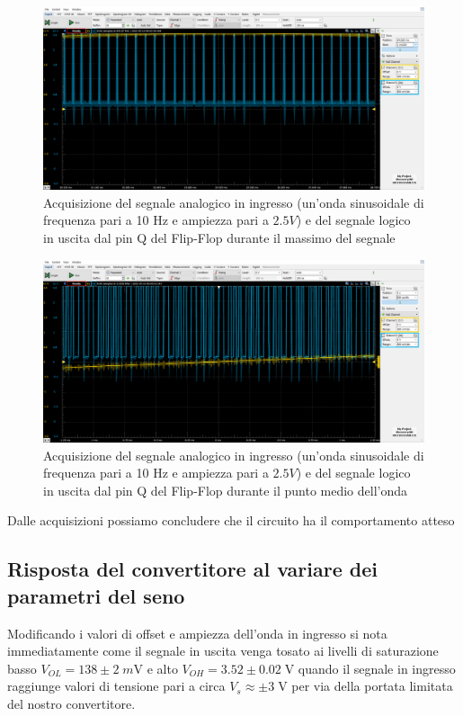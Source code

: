 \documentclass[10pt, a4paper, italian]{article}
\begin{document}
\begin{figure}[htbp]
    \centering
	\includegraphics[width=\textwidth]{TOP}
    \caption{Acquisizione del segnale analogico in ingresso (un'onda sinusoidale di frequenza pari a 10 Hz e ampiezza pari a $2.5 V$) e del segnale logico in uscita dal pin Q del Flip-Flop durante il massimo del segnale}
\end{figure}
\begin{figure}[htbp]
    \centering
	\includegraphics[width=\textwidth]{MIDDLE}
    \caption{Acquisizione del segnale analogico in ingresso (un'onda sinusoidale di frequenza pari a 10 Hz e ampiezza pari a $2.5 V$) e del segnale logico in uscita dal pin Q del Flip-Flop durante il punto medio dell'onda}
\end{figure}
Dalle acquisizioni possiamo concludere che il circuito ha il comportamento atteso
\subsection{Risposta del convertitore al variare dei parametri del seno}
\label{sbs: adcresp}
Modificando i valori di offset e ampiezza dell'onda in ingresso si nota
immediatamente come il segnale in uscita venga tosato ai livelli di
saturazione basso $V_{OL} = 138 \pm 2 \; \si{m\V}$ e alto
$V_{OH} = 3.52 \pm 0.02 \; \si{\V}$ quando il segnale in ingresso raggiunge
valori di tensione pari a circa $V_s \approx \pm 3 \; \si{\V}$ per via della
portata limitata del nostro convertitore.
\end{document}

